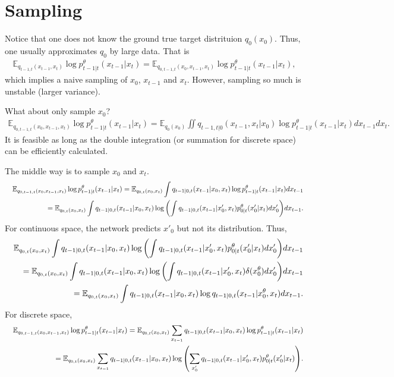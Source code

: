 \documentclass[10pt]{article}
\begin{document}
\section{Sampling}

Notice that one does not know the ground true target distrituion $q_0(x_0)$. Thus, one usually approximates $q_0$ by large data. That is
\begin{eqnarray*}
  \mathbb{E}_{q_{t-1,t}(x_{t-1},x_t)}\log p_{t-1|t}^\theta(x_{t-1}|x_t) = \mathbb{E}_{q_{0,t-1,t}(x_0,x_{t-1},x_t)}\log p_{t-1|t}^\theta(x_{t-1}|x_t),
\end{eqnarray*}
which implies a naive sampling of $x_0$, $x_{t-1}$ and $x_t$. However, sampling so much is unstable (larger variance).

What about only sample $x_0$?
\begin{eqnarray*}
  \mathbb{E}_{q_{0,t-1,t}(x_0,x_{t-1},x_t)}\log p_{t-1|t}^\theta(x_{t-1}|x_t) = \mathbb{E}_{q_0(x_0)}\iint q_{t-1,t|0}(x_{t-1},x_t|x_0)\log p_{t-1|t}^\theta(x_{t-1}|x_t) dx_{t-1}dx_t.
\end{eqnarray*}
It is feasible as long as the double integration (or summation for discrete space) can be efficiently calculated.

The middle way is to sample $x_0$ and $x_t$.
\begin{eqnarray*}
  &&\mathbb{E}_{q_{0,t-1,t}(x_0,x_{t-1},x_t)}\log p_{t-1|t}^\theta(x_{t-1}|x_t) = \mathbb{E}_{q_{0,t}(x_0,x_t)}\int q_{t-1|0,t}(x_{t-1}|x_0,x_t)\log p_{t-1|t}^\theta(x_{t-1}|x_t) dx_{t-1}\\
  &&= \mathbb{E}_{q_{0,t}(x_0,x_t)}\int q_{t-1|0,t}(x_{t-1}|x_0,x_t)\log \qty(\int q_{t-1|0,t}(x_{t-1}|x'_0,x_t) p_{0|t}^\theta(x'_0|x_t) dx'_0) dx_{t-1}.
\end{eqnarray*}
For continuous space, the network predicts $x'_0$ but not its distribution. Thus,
\begin{eqnarray*}
  &&\mathbb{E}_{q_{0,t}(x_0,x_t)}\int q_{t-1|0,t}(x_{t-1}|x_0,x_t)\log \qty(\int q_{t-1|0,t}(x_{t-1}|x'_0,x_t) p_{0|t}^\theta(x'_0|x_t) dx'_0) dx_{t-1}\\
  &&=\mathbb{E}_{q_{0,t}(x_0,x_t)}\int q_{t-1|0,t}(x_{t-1}|x_0,x_t)\log \qty(\int q_{t-1|0,t}(x_{t-1}|x'_0,x_t) \delta(x_0^\theta) dx'_0) dx_{t-1}\\
  &&=\mathbb{E}_{q_{0,t}(x_0,x_t)}\int q_{t-1|0,t}(x_{t-1}|x_0,x_t)\log q_{t-1|0,t}(x_{t-1}|x^\theta_0,x_t) dx_{t-1}.
\end{eqnarray*}
For discrete space,
\begin{eqnarray}\label{EqDisSpaTarget}
  &&\mathbb{E}_{q_{0,t-1,t}(x_0,x_{t-1},x_t)}\log p_{t-1|t}^\theta(x_{t-1}|x_t) = \mathbb{E}_{q_{0,t}(x_0,x_t)}\sum_{x_{t-1}} q_{t-1|0,t}(x_{t-1}|x_0,x_t)\log p_{t-1|t}^\theta(x_{t-1}|x_t)\\
  &&= \mathbb{E}_{q_{0,t}(x_0,x_t)}\sum_{x_{t-1}} q_{t-1|0,t}(x_{t-1}|x_0,x_t)\log \qty(\sum_{x'_0} q_{t-1|0,t}(x_{t-1}|x'_0,x_t) p_{0|t}^\theta(x'_0|x_t)).
\end{eqnarray}
\end{document}
